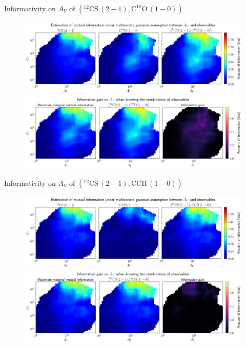 \documentclass{beamer}
\begin{document}
\begin{frame}{Informativity on $A_V$ of $\left(\mathrm{^{12}CS\,(2-1)},\mathrm{C^{18}O\,(1-0)}\right)$}
    \begin{figure}
        \centering
        \includegraphics[width=0.95\linewidth]{../linearinfogauss/av__12cs21_c18o10_linearinfogauss.png}
        \vfill
        \includegraphics[width=0.95\linewidth]{../linearinfogauss/av__12cs21_c18o10_linearinfogauss_gain.png}
    \end{figure}
\end{frame}

\begin{frame}{Informativity on $A_V$ of $\left(\mathrm{^{12}CS\,(2-1)},\mathrm{CCH\,(1-0)}\right)$}
    \begin{figure}
        \centering
        \includegraphics[width=0.95\linewidth]{../linearinfogauss/av__12cs21_cch10_linearinfogauss.png}
        \vfill
        \includegraphics[width=0.95\linewidth]{../linearinfogauss/av__12cs21_cch10_linearinfogauss_gain.png}
    \end{figure}
\end{frame}
\end{document}
